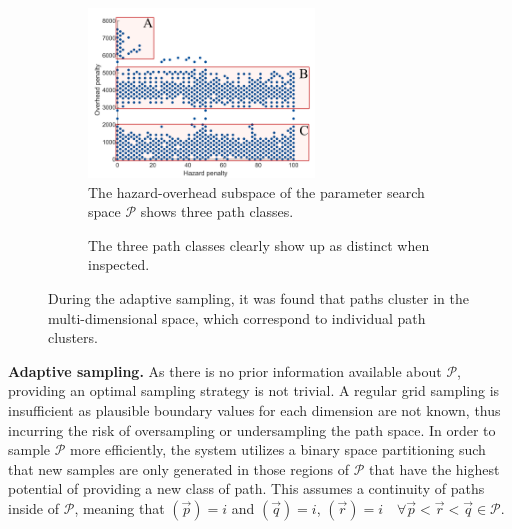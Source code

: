 \begin{figure}
\centering
\begin{subfigure}[b]{0.4\textwidth}
    \includegraphics[width=\textwidth, height=4.5cm]{figures/contributions/usar/adaptive_sampling_space.png}
    \caption{The hazard-overhead subspace of the parameter search space $\mathcal{P}$ shows three path classes.}
    \label{contributions:usar:adaptive:space}
\end{subfigure}
\hspace*{1cm}
\begin{subfigure}[b]{0.3\textwidth}
    \caption{The three path classes clearly show up as distinct when inspected.}
    \label{contributions:usar:adaptive:rendering}
\end{subfigure}
\caption{During the adaptive sampling, it was found that paths cluster in the multi-dimensional space, which correspond to individual path clusters.}
\label{contributions:usar:adaptive}
\end{figure}

\textbf{Adaptive sampling.}  As there is no prior information available about $\mathcal{P}$, providing an optimal sampling strategy is not trivial.  A regular grid sampling is insufficient as plausible boundary values for each dimension are not known, thus incurring the risk of oversampling or undersampling the path space.  In order to sample $\mathcal{P}$ more efficiently, the system utilizes a binary space partitioning such that new samples are only generated in those regions of $\mathcal{P}$ that have the highest potential of providing a new class of path.  This assumes a continuity of paths inside of $\mathcal{P}$, meaning that \astar $\left( \vec{p} \right) = i$ and \astar $\left( \vec{q} \right) = i$, \astar $\left( \vec{r} \right) = i \quad \forall \vec{p} < \vec{r} < \vec{q} \in \mathcal{P}$.


